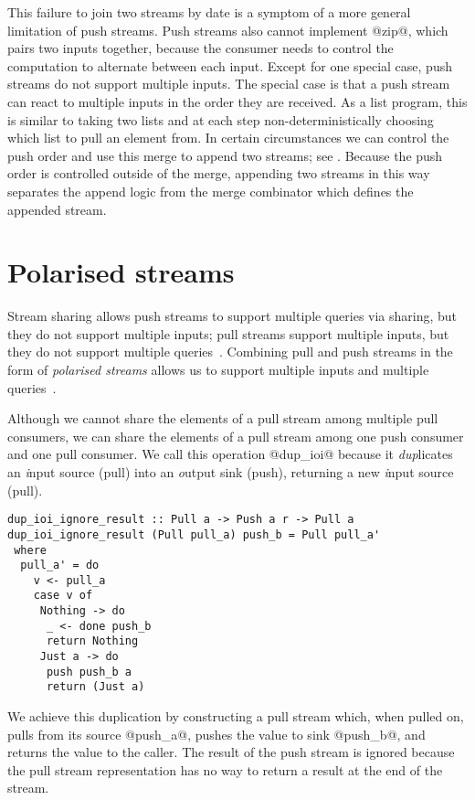 This failure to join two streams by date is a symptom of a more general limitation of push streams.
Push streams also cannot implement @zip@, which pairs two inputs together, because the consumer needs to control the computation to alternate between each input.
Except for one special case, push streams do not support multiple inputs.
The special case is that a push stream can react to multiple inputs in the order they are received.
As a list program, this is similar to taking two lists and at each step non-deterministically choosing which list to pull an element from.
In certain circumstances we can control the push order and use this merge to append two streams; see .
Because the push order is controlled outside of the merge, appending two streams in this way separates the append logic from the merge combinator which defines the appended stream.

\section{Polarised streams}
\label{taxonomy/polarised}

Stream sharing allows push streams to support multiple queries via sharing, but they do not support multiple inputs; pull streams support multiple inputs, but they do not support multiple queries~\citep{kay2009you}.
Combining pull and push streams in the form of \emph{polarised streams} allows us to support multiple inputs and multiple queries~\citep{lippmeier2016polarized}.


Although we cannot share the elements of a pull stream among multiple pull consumers, we can share the elements of a pull stream among one push consumer and one pull consumer.
We call this operation @dup_ioi@ because it \emph{dup}licates an \emph{i}nput source (pull) into an \emph{o}utput sink (push), returning a new \emph{i}nput source (pull).

\begin{lstlisting}
dup_ioi_ignore_result :: Pull a -> Push a r -> Pull a
dup_ioi_ignore_result (Pull pull_a) push_b = Pull pull_a'
 where
  pull_a' = do
    v <- pull_a
    case v of
     Nothing -> do
      _ <- done push_b
      return Nothing
     Just a -> do
      push push_b a
      return (Just a)
\end{lstlisting}

We achieve this duplication by constructing a pull stream which, when pulled on, pulls from its source @push_a@, pushes the value to sink @push_b@, and returns the value to the caller.
The result of the push stream is ignored because the pull stream representation has no way to return a result at the end of the stream.

